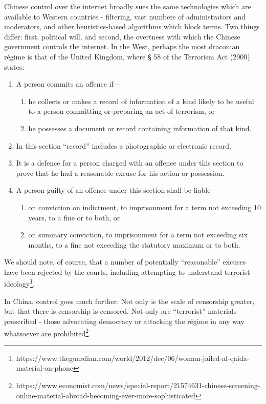 	Chinese control over the internet broadly sues the same technologies
	which are available to Western countries - filtering, vast numbers of
	administrators and moderators, and other heuristics-based algorithms
	which block terms. Two things differ: first, political will, and second,
	the overtness with which the Chinese government controls the internet.
	In the West, perhaps the most draconian régime is that of the United
	Kingdom, where § 58 of the Terrorism Act (2000) states:

	\begin{enumerate}
		\item
		A person commits an offence if---

		\begin{enumerate}
			\item
			he collects or makes a record of information of a kind likely to be
			useful to a person committing or preparing an act of terrorism, or
			\item
			he possesses a document or record containing information of that
			kind.
		\end{enumerate}
		\item
		In this section ``record'' includes a photographic or electronic
		record.
		\item
		It is a defence for a person charged with an offence under this
		section to prove that he had a reasonable excuse for his action or
		possession.
		\item
		A person guilty of an offence under this section shall be liable---

		\begin{enumerate}
			\item
			on conviction on indictment, to imprisonment for a term not
			exceeding 10 years, to a fine or to both, or
			\item
			on summary conviction, to imprisonment for a term not exceeding six
			months, to a fine not exceeding the statutory maximum or to both.
		\end{enumerate}
	\end{enumerate}

	We should note, of course, that a number of potentially ``reasonable''
	excuses have been rejected by the courts, including attempting to
	understand terrorist ideology\footnote{https://www.theguardian.com/world/2012/dec/06/woman-jailed-al-qaida-material-on-phone}.

	In China, control goes much further. Not only is the scale of censorship
	greater, but that there is censorship is censored. Not only are
	``terrorist'' materials proscribed - those advocating democracy or
	attacking the régime in any way whatsoever are prohibited\footnote{https://www.economist.com/news/special-report/21574631-chinese-screening-online-material-abroad-becoming-ever-more-sophisticated}.


